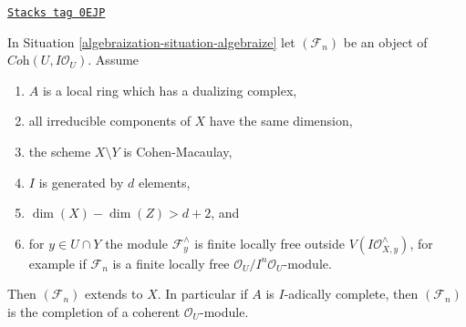 \begin{lemma}
\label{algebraization-lemma-interesting-case-final}
\href{https://stacks.math.columbia.edu/tag/0EJP}{\texttt{Stacks tag 0EJP}}

In Situation \ref{algebraization-situation-algebraize} let $(\mathcal{F}_n)$
be an object of $\textit{Coh}(U, I\mathcal{O}_U)$. Assume
\begin{enumerate}
\item $A$ is a local ring which has a dualizing complex,
\item all irreducible components of $X$ have the same dimension,
\item the scheme $X \setminus Y$ is Cohen-Macaulay,
\item $I$ is generated by $d$ elements,
\item $\dim(X) - \dim(Z) > d + 2$, and
\item for $y \in U \cap Y$ the module $\mathcal{F}_y^\wedge$
is finite locally free outside $V(I\mathcal{O}_{X, y}^\wedge)$,
for example if $\mathcal{F}_n$ is a finite locally free
$\mathcal{O}_U/I^n\mathcal{O}_U$-module.
\end{enumerate}
Then $(\mathcal{F}_n)$ extends to $X$. In particular if $A$ is $I$-adically
complete, then $(\mathcal{F}_n)$ is the completion of a coherent
$\mathcal{O}_U$-module.
\end{lemma}

